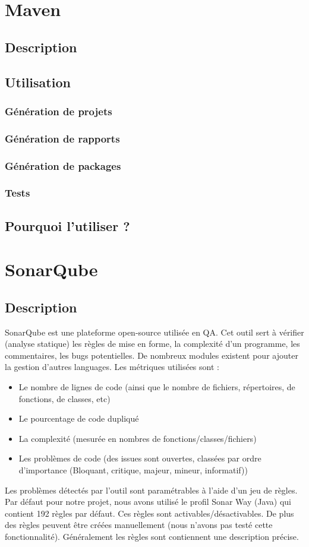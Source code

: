 \documentclass{article}
\begin{document}
\section{Maven}
\subsection{Description}
\subsection{Utilisation}
\subsubsection{Génération de projets}
\subsubsection{Génération de rapports}
\subsubsection{Génération de packages}
\subsubsection{Tests}
\subsection{Pourquoi l'utiliser ?}


\section{SonarQube}
\subsection{Description}
SonarQube est une plateforme open-source utilisée en QA. Cet outil sert à vérifier (analyse statique) les règles de mise en forme, la complexité d'un programme, les commentaires, les bugs potentielles. De nombreux modules existent pour ajouter la gestion d'autres languages. Les métriques utilisées sont :
\begin{itemize}
	\item Le nombre de lignes de code (ainsi que le nombre de fichiers, répertoires, de fonctions, de classes, etc)
	\item Le pourcentage de code dupliqué
	\item La complexité (mesurée en nombres de fonctions/classes/fichiers)
	\item Les problèmes de code (des issues sont ouvertes, classées par ordre d'importance (Bloquant, critique, majeur, mineur, informatif))
\end{itemize}
Les problèmes détectés par l'outil sont paramétrables à l'aide d'un jeu de règles. Par défaut pour notre projet, nous avons utilisé le profil Sonar Way (Java) qui contient 192 règles par défaut. Ces règles sont activables/désactivables. De plus des règles peuvent être créées manuellement (nous n'avons pas testé cette fonctionnalité). Généralement les règles sont contiennent une description précise.
\end{document}

